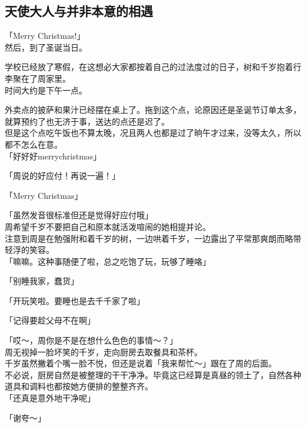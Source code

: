 \subsection{天使大人与并非本意的相遇}

「Merry Christmas!」\\

然后，到了圣诞当日。

学校已经放了寒假，在这想必大家都按着自己的过法度过的日子，树和千岁抱着行李聚在了周家里。\\

时间大约是下午一点。

外卖点的披萨和果汁已经摆在桌上了。拖到这个点，论原因还是圣诞节订单太多，就算预约了也无济于事，送达的点还是迟了。\\

但是这个点吃午饭也不算太晚，况且两人也都是过了晌午才过来，没等太久，所以都不怎么在意。\\

「好好好merrychristmas」

「周说的好应付！再说一遍！」

「Merry Christmas」

「虽然发音很标准但还是觉得好应付哦」\\

周希望千岁不要把自己和原本就活泼喧闹的她相提并论。\\

注意到周是在勉强附和着千岁的树，一边哄着千岁，一边露出了平常那爽朗而略带轻浮的笑容。\\

「嘛嘛。这种事随便了啦，总之吃饱了玩，玩够了睡咯」

「别睡我家，蠢货」

「开玩笑啦。要睡也是去千千家了啦」

「记得要趁父母不在啊」

「哎～，周你是不是在想什么色色的事情～？」\\

周无视掉一脸坏笑的千岁，走向厨房去取餐具和茶杯。\\

千岁虽然撇着个嘴一脸不悦，但还是说着「我来帮忙～」跟在了周的后面。\\

不必说，厨房自然是被整理的干干净净。毕竟这已经算是真昼的领土了，自然各种道具和调料也都按她方便排的整整齐齐。\\

「还真是意外地干净呢」

「谢夸～」\\

